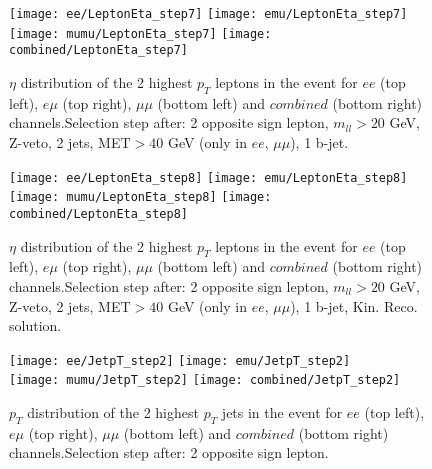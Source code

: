 \documentclass[12pt, a4paper, titlepage]{article}
\begin{document}
\clearpage
\newpage

\begin{figure}
  \texttt{[image: ee/LeptonEta\_step7]}
  \texttt{[image: emu/LeptonEta\_step7]}\\
  \texttt{[image: mumu/LeptonEta\_step7]}
  \texttt{[image: combined/LeptonEta\_step7]}
\caption{$\eta$ distribution of the 2 highest $p_T$ leptons in the event for $ee$ (top left), $e\mu$ (top right), $\mu\mu$ (bottom left) and $combined$ (bottom right) channels.\newline Selection step after: 2 opposite sign lepton, $m_{ll}>20$ GeV, Z-veto, 2 jets, MET$>40$ GeV (only in $ee$, $\mu\mu$), 1 b-jet.}
\end{figure}

\clearpage
\newpage


\begin{figure}
  \texttt{[image: ee/LeptonEta\_step8]}
  \texttt{[image: emu/LeptonEta\_step8]}\\
  \texttt{[image: mumu/LeptonEta\_step8]}
  \texttt{[image: combined/LeptonEta\_step8]}
\caption{$\eta$ distribution of the 2 highest $p_T$ leptons in the event for $ee$ (top left), $e\mu$ (top right), $\mu\mu$ (bottom left) and $combined$ (bottom right) channels.\newline Selection step after: 2 opposite sign lepton, $m_{ll}>20$ GeV, Z-veto, 2 jets, MET$>40$ GeV (only in $ee$, $\mu\mu$), 1 b-jet, Kin. Reco. solution.}
\end{figure}

\clearpage
\newpage





\begin{figure}
  \texttt{[image: ee/JetpT\_step2]}
  \texttt{[image: emu/JetpT\_step2]}\\
  \texttt{[image: mumu/JetpT\_step2]}
  \texttt{[image: combined/JetpT\_step2]}
\caption{$p_T$ distribution of the 2 highest $p_T$ jets in the event for $ee$ (top left), $e\mu$ (top right), $\mu\mu$ (bottom left) and $combined$ (bottom right) channels.\newline Selection step after: 2 opposite sign lepton.}
\end{figure}
\end{document}
